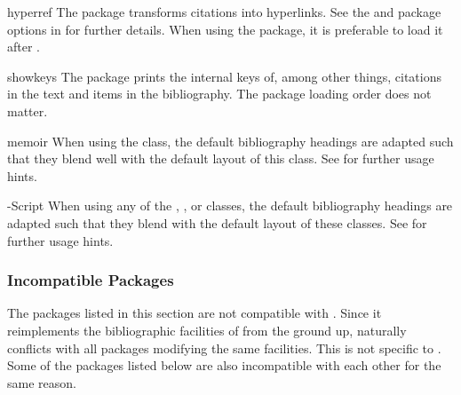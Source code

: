 \documentclass{ltxdockit}[2011/03/25]
\begin{document}
\begin{marglist}

\item[hyperref]
The  package transforms citations into hyperlinks. See the  and  package options in  for further details. When using the  package, it is preferable to load it after .

\item[showkeys]
The  package prints the internal keys of, among other things, citations in the text and items in the bibliography. The package loading order does not matter.

\item[memoir]
When using the  class, the default bibliography headings are adapted such that they blend well with the default layout of this class. See  for further usage hints.

\item[\acr{KOMA}-Script]
When using any of the , , or  classes, the default bibliography headings are adapted such that they blend with the default layout of these classes. See  for further usage hints.

\end{marglist}

\subsubsection{Incompatible Packages}
\label{int:pre:inc}

The packages listed in this section are not compatible with . Since it reimplements the bibliographic facilities of \latex from the ground up,  naturally conflicts with all packages modifying the same facilities. This is not specific to . Some of the packages listed below are also incompatible with each other for the same reason.
\end{document}
